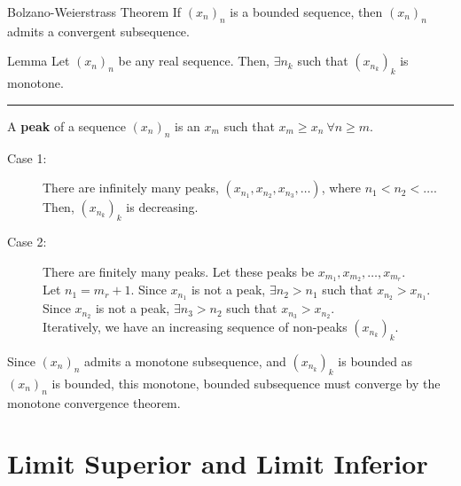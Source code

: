 \documentclass[10pt]{extarticle}
\begin{document}
  \begin{problem}{Bolzano-Weierstrass Theorem}
    If $(x_n)_n$ is a bounded sequence, then $(x_n)_n$ admits a convergent subsequence.
    \begin{problem}{Lemma}
      Let $(x_n)_n$ be any real sequence. Then, $\exists n_k$ such that $(x_{n_k})_k$ is monotone.\\
      \vspace{4pt}
      \rule{\textwidth}{0.4pt}
      \vspace{4pt}
      A \textbf{peak} of a sequence $(x_n)_n$ is an $x_m$ such that $x_m \geq x_n~\forall n\geq m$.
      \tcblower
      \begin{description}
        \item[Case 1:] There are infinitely many peaks, $(x_{n_1}, x_{n_2},x_{n_3},\dots)$, where $n_1 < n_2 < \dots$. Then, $\left(x_{n_k}\right)_k$ is decreasing.
        \item[Case 2:] There are finitely many peaks. Let these peaks be $x_{m_1},x_{m_2},\dots,x_{m_r}$.\\

          Let $n_1 = m_r + 1$. Since $x_{n_1}$ is not a peak, $\exists n_2 > n_1$ such that $x_{n_2} > x_{n_1}$. Since $x_{n_2}$ is not a peak, $\exists n_3 > n_2$ such that $x_{n_3} > x_{n_2}$.\\

          Iteratively, we have an increasing sequence of non-peaks $(x_{n_k})_k$.
      \end{description}
    \end{problem}
    \tcblower
    Since $(x_n)_n$ admits a monotone subsequence, and $(x_{n_k})_k$ is bounded as $(x_n)_n$ is bounded, this monotone, bounded subsequence must converge by the monotone convergence theorem.
  \end{problem}
  \section{Limit Superior and Limit Inferior}%
  
\end{document}
